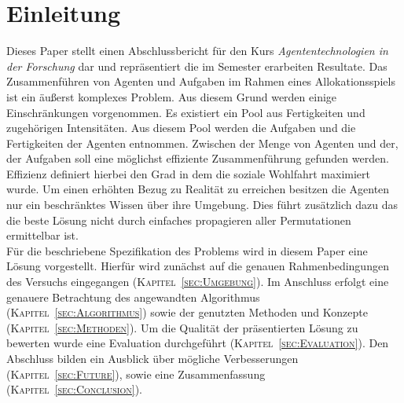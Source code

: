 \documentclass[fleqn,10pt]{SelfArx} %
\newcommand{\ChapterCite}[1]{\textsc{Kapitel~\ref{#1}}}
\begin{document}
\flushbottom %

\maketitle %

\tableofcontents %

\thispagestyle{empty} %


\section*{Einleitung} %
\label{sec:introduction}


Dieses Paper stellt einen Abschlussbericht für den Kurs \textit{Agententechnologien in der Forschung} dar und repräsentiert die im Semester erarbeiten Resultate. Das Zusammenführen von Agenten und Aufgaben im Rahmen eines Allokationsspiels ist ein äußerst komplexes Problem. Aus diesem Grund werden einige Einschränkungen vorgenommen. Es existiert ein Pool aus Fertigkeiten und zugehörigen Intensitäten. Aus diesem Pool werden die Aufgaben und die Fertigkeiten der Agenten entnommen. Zwischen der Menge von Agenten und der, der Aufgaben soll eine möglichst effiziente Zusammenführung gefunden werden. Effizienz definiert hierbei den Grad in dem die soziale Wohlfahrt maximiert wurde. Um einen erhöhten Bezug zu Realität zu erreichen besitzen die Agenten nur ein beschränktes Wissen über ihre Umgebung. Dies führt zusätzlich dazu das die beste Lösung nicht durch einfaches propagieren aller Permutationen ermittelbar ist. \\
Für die beschriebene Spezifikation des Problems wird in diesem Paper eine Lösung vorgestellt. Hierfür wird zunächst auf die genauen Rahmenbedingungen des Versuchs eingegangen (\ChapterCite{sec:Umgebung}). Im Anschluss erfolgt eine genauere Betrachtung des angewandten Algorithmus (\ChapterCite{sec:Algorithmus}) sowie der genutzten Methoden und Konzepte (\ChapterCite{sec:Methoden}). Um die Qualität der präsentierten Lösung zu bewerten wurde eine Evaluation durchgeführt (\ChapterCite{sec:Evaluation}). Den Abschluss bilden ein Ausblick über mögliche Verbesserungen (\ChapterCite{sec:Future}), sowie eine Zusammenfassung (\ChapterCite{sec:Conclusion}). 
\end{document}
